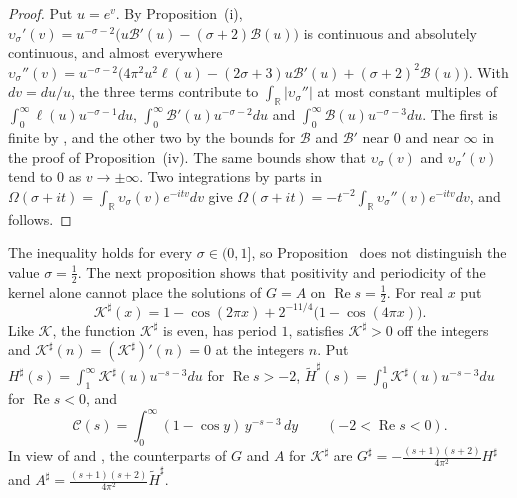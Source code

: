 \begin{proof}
Put $u=e^v$. By Proposition~\textup{(i)}, $\upsilon_\sigma'(v)=u^{-\sigma-2}\bigl(u\mathcal B'(u)-(\sigma+2)\mathcal B(u)\bigr)$ is continuous and absolutely continuous, and almost everywhere $\upsilon_\sigma''(v)=u^{-\sigma-2}\bigl(4\pi^2u^2\ell(u)-(2\sigma+3)u\mathcal B'(u)+(\sigma+2)^2\mathcal B(u)\bigr)$. With $dv=du/u$, the three terms contribute to $\int_{\mathbb R}|\upsilon_\sigma''|$ at most constant multiples of $\int_0^\infty\ell(u)u^{-\sigma-1}du$, $\int_0^\infty\mathcal B'(u)u^{-\sigma-2}du$ and $\int_0^\infty\mathcal B(u)u^{-\sigma-3}du$. The first is finite by , and the other two by the bounds for $\mathcal B$ and $\mathcal B'$ near $0$ and near $\infty$ in the proof of Proposition~\textup{(iv)}. The same bounds show that $\upsilon_\sigma(v)$ and $\upsilon_\sigma'(v)$ tend to $0$ as $v\to\pm\infty$. Two integrations by parts in $\Omega(\sigma+it)=\int_{\mathbb R}\upsilon_\sigma(v)e^{-itv}dv$ give $\Omega(\sigma+it)=-t^{-2}\int_{\mathbb R}\upsilon_\sigma''(v)e^{-itv}dv$, and  follows.
\end{proof}

The inequality  holds for every $\sigma\in(0,1]$, so Proposition~ does not distinguish the value $\sigma=\frac12$. The next proposition shows that positivity and periodicity of the kernel alone cannot place the solutions of $G=A$ on $\operatorname{Re}s=\frac12$. For real $x$ put
\begin{equation}\label{eq:Ksharp}
\mathcal K^\sharp(x)=1-\cos(2\pi x)+2^{-11/4}\bigl(1-\cos(4\pi x)\bigr) .
\end{equation}
Like $\mathcal K$, the function $\mathcal K^\sharp$ is even, has period $1$, satisfies $\mathcal K^\sharp>0$ off the integers and $\mathcal K^\sharp(n)=(\mathcal K^\sharp)'(n)=0$ at the integers $n$. Put $H^\sharp(s)=\int_1^\infty\mathcal K^\sharp(u)u^{-s-3}du$ for $\operatorname{Re}s>-2$, $\widetilde H^\sharp(s)=\int_0^1\mathcal K^\sharp(u)u^{-s-3}du$ for $\operatorname{Re}s<0$, and
\begin{equation}\label{eq:Cdef}
\mathcal C(s)=\int_0^\infty(1-\cos y)\,y^{-s-3}\,dy\qquad(-2<\operatorname{Re}s<0).
\end{equation}
In view of  and , the counterparts of $G$ and $A$ for $\mathcal K^\sharp$ are $G^\sharp=-\frac{(s+1)(s+2)}{4\pi^2}H^\sharp$ and $A^\sharp=\frac{(s+1)(s+2)}{4\pi^2}\widetilde H^\sharp$.

